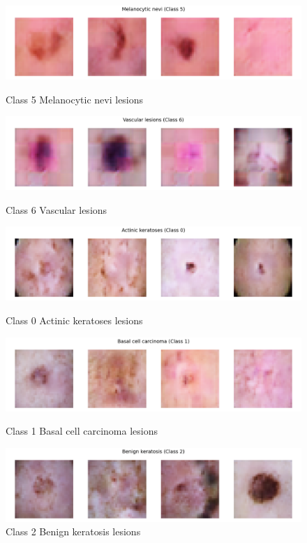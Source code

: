 \documentclass{article}
\begin{document}
\begin{figure}[htbp]
\begin{minipage}{0.45\textwidth}
        \includegraphics[width=\linewidth]{class_5_Melanocytic_nevi.png}
        \caption{Class 5 Melanocytic nevi lesions}
        
        \includegraphics[width=\linewidth]{class_6_Vascular_lesions.png}
        \caption{Class 6 Vascular lesions}
    \end{minipage} 
    \hfill
    \begin{minipage}{0.45\textwidth}
        \centering
        \captionsetup{labelformat=empty} 
        \includegraphics[width=\linewidth]{uagan-class_0_Actinic_keratoses.png}
        \caption{Class 0 Actinic keratoses lesions}
        
        \includegraphics[width=\linewidth]{uagan-class_1_Basal_cell_carcinoma.png}
        \caption{Class 1 Basal cell carcinoma lesions}
        
        \includegraphics[width=\linewidth]{uagan-class_2_Benign_keratosis.png}
        \caption{Class 2 Benign keratosis lesions}
        

\end{minipage}
\end{figure}
\end{document}
